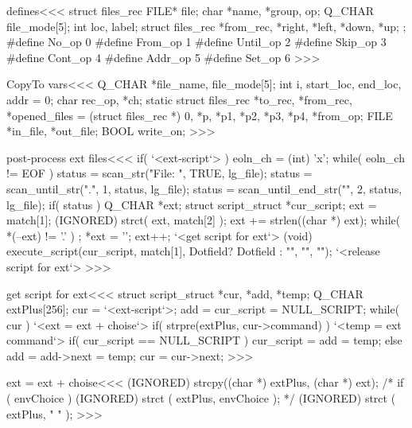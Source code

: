 \<defines\><<<
struct files_rec{
  FILE* file;
  char *name, *group, op;
  Q_CHAR file_mode[5];
  int loc, label;
  struct files_rec  *from_rec, *right, *left, *down, *up;
};
#define No_op     0
#define From_op   1
#define Until_op  2
#define Skip_op   3
#define Cont_op   4
#define Addr_op   5
#define Set_op    6
>>>

\<CopyTo vars\><<<
Q_CHAR *file_name, file_mode[5];
int i, start_loc, end_loc, addr = 0;
char rec_op, *ch;
static struct files_rec *to_rec, *from_rec,
   *opened_files = (struct files_rec *) 0,
   *p, *p1, *p2, *p3, *p4, *from_op;
FILE *in_file, *out_file;
BOOL write_on;
>>>

















\<post-process ext files\><<<
if( `<ext-script`> ){
  eoln_ch = (int) 'x';
  while( eoln_ch != EOF ) {
     status = scan_str("File: ", TRUE, lg_file);
     status = scan_until_str(".", 1, status, lg_file);
     status = scan_until_end_str("", 2, status, lg_file);
     if( status ){                  Q_CHAR *ext;
                      struct script_struct *cur_script;
        ext = match[1];
        (IGNORED) strct( ext, match[2] );
        ext += strlen((char *) ext);
        while( *(--ext) != '.' ){ ; }
        *ext = '\0'; ext++;
        `<get script for ext`>
        (void) execute_script(cur_script, 
                 match[1], Dotfield? Dotfield : "", "", "");  
        `<release script for ext`>
} }  }
>>>


\<get script for ext\><<<
{
            struct script_struct *cur, *add, *temp;
            Q_CHAR extPlus[256];                     
  cur = `<ext-script`>;
  add = cur_script = NULL_SCRIPT;
  while( cur ){
     `<ext = ext + choise`>
     if( strpre(extPlus, cur->command) ){
        `<temp = ext command`>
        if( cur_script == NULL_SCRIPT ){
           cur_script = add = temp;
        } else {
           add = add->next = temp;
     }  }
     cur = cur->next;
} }  
>>>



\<ext = ext + choise\><<<
(IGNORED) strcpy((char *) extPlus, (char *) ext);
/* 
   if ( envChoice ) {
      (IGNORED) strct ( extPlus, envChoice );
   }
*/
(IGNORED) strct ( extPlus, " " );
>>>
 
